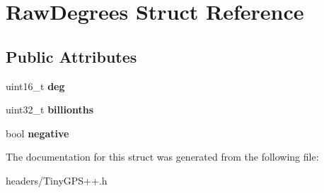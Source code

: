 \hypertarget{struct_raw_degrees}{}\section{Raw\+Degrees Struct Reference}
\label{struct_raw_degrees}
\subsection*{Public Attributes}
\begin{DoxyCompactItemize}
\item 
uint16\+\_\+t {\bfseries deg}\hypertarget{struct_raw_degrees_a11831d9220f303bd716d9412af28e84e}{}\label{struct_raw_degrees_a11831d9220f303bd716d9412af28e84e}

\item 
uint32\+\_\+t {\bfseries billionths}\hypertarget{struct_raw_degrees_a13564009c60e20dbf03b158114d1c0e2}{}\label{struct_raw_degrees_a13564009c60e20dbf03b158114d1c0e2}

\item 
bool {\bfseries negative}\hypertarget{struct_raw_degrees_a39c31d2d0332155a4d2c975cec0a796f}{}\label{struct_raw_degrees_a39c31d2d0332155a4d2c975cec0a796f}

\end{DoxyCompactItemize}


The documentation for this struct was generated from the following file\+:\begin{DoxyCompactItemize}
\item 
headers/Tiny\+G\+P\+S++.\+h\end{DoxyCompactItemize}
